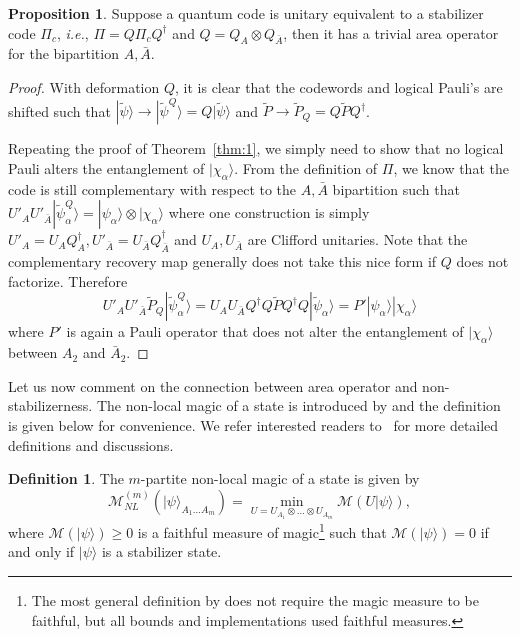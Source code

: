 \documentclass[a4paper,11pt]{article}
\theoremstyle{definition}
\newtheorem{definition}{Definition}[section]
\newtheorem{proposition}{Proposition}[section]
\numberwithin{equation}{section}
\begin{document}
\begin{proposition}\label{prop:LU}
    Suppose a quantum code is unitary equivalent to a stabilizer code $\Pi_c$, \emph{i.e.}, $\Pi=Q\Pi_c Q^{\dagger}$ and $Q=Q_{A}\otimes Q_{\bar{A}}$, then it has a trivial area operator for the bipartition $A,\bar{A}$.
\end{proposition}

\begin{proof}
With deformation $Q$, it is clear that the codewords and logical Pauli's are shifted such that $|\tilde{\psi}\rangle\rightarrow |\tilde{\psi}^Q\rangle=Q|\tilde{\psi}\rangle$ and $\tilde{P}\rightarrow \tilde{P}_Q=Q\tilde{P}Q^{\dagger}$.

Repeating the proof of Theorem~\ref{thm:1}, we simply need to show that no logical Pauli alters the entanglement of $|\chi_{\alpha}\rangle$.  From the definition of $\Pi$, we know that the code is still complementary with respect to the $A,\bar{A}$ bipartition such that $U'_{A}U'_{\bar{A}}|\tilde{\psi}_{\alpha}^Q\rangle =|\psi_{\alpha}\rangle\otimes |\chi_{\alpha}\rangle$ where one construction is simply $U'_{A}=U_AQ_A^{\dagger}, U'_{\bar{A}}=U_{\bar{A}}Q_{\bar{A}}^{\dagger}$ and $U_A,U_{\bar{A}}$ are Clifford unitaries. Note that the complementary recovery map generally does not take this nice form if $Q$ does not factorize. Therefore
\begin{equation}
    U'_AU'_{\bar{A}}\tilde{P}_Q|\tilde{\psi}^Q_{\alpha}\rangle = U_A U_{\bar{A}} Q^{\dagger} Q\tilde{P}Q^{\dagger} Q|\tilde{\psi}_{\alpha}\rangle = P'|\psi_{\alpha}\rangle|\chi_{\alpha}\rangle
\end{equation}
where $P'$ is again a Pauli operator that does not alter the entanglement of $|\chi_{\alpha}\rangle$ between $A_2$ and $\bar{A}_2$. 
\end{proof}

Let us now comment on the connection between area operator and non-stabilizerness. The non-local magic of a state is introduced by \cite{NLmagicHamma} and the definition is given below for convenience.  We refer interested readers to~\cite{NLmagicHamma} for more detailed definitions and discussions.
\begin{definition}
    The $m$-partite non-local magic of a state is given by 
    $$\mathcal{M}^{(m)}_{NL}(|\psi\rangle_{A_1\dots A_m}) = \min_{U=U_{A_1}\otimes \dots\otimes U_{A_m}}\mathcal{M}(U|\psi\rangle),$$
    where $\mathcal{M}(|\psi\rangle)\geq 0$ is a faithful measure of magic\footnote{The most general definition by \cite{NLmagicHamma} does not require the magic measure to be faithful, but all bounds and implementations used faithful measures.} such that $\mathcal{M}(|\psi\rangle)=0$ if and only if $|\psi\rangle$ is a stabilizer state.
\end{definition}
\end{document}
